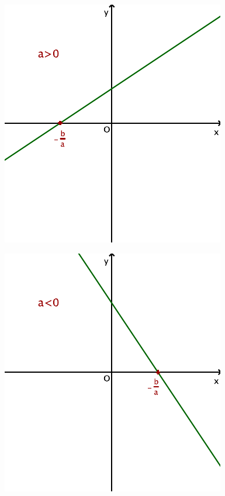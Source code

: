 \begin{minipage}[c]{0.4\linewidth}
  \centering
  \includegraphics[width=0.6\linewidth]{F_Affine_a}
\end{minipage}
\quad
\begin{minipage}[c]{0.4\linewidth}
  \centering
  \includegraphics[width=0.6\linewidth]{F_Affine_b}
\end{minipage}



